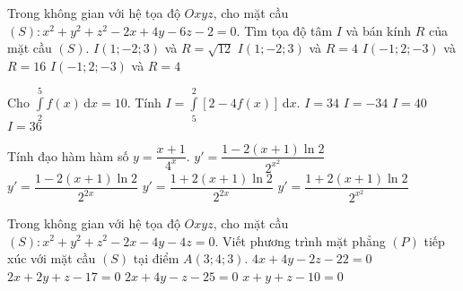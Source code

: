 \begin{ex}%
	Trong không gian với hệ tọa độ $Oxyz$, cho mặt cầu $(S)\colon x^2+y^2+z^2-2x+4y-6 z-2=0$. Tìm tọa độ tâm $I$ và bán kính $R$ của mặt cầu $(S)$.
	\choice
	{$I(1;-2;3)$ và $R=\sqrt{12}$}
	{\True $I(1;-2;3)$ và $R=4$}
	{$I(-1;2;-3)$ và $R=16$}
	{$I(-1;2;-3)$ và $R=4$}
\end{ex}
\begin{ex}%
	Cho $\displaystyle\int\limits_2^5 f(x) \mathrm{\,d}x=10$. Tính $I=\displaystyle\int\limits_5^2 \left[2-4f(x)\right] \mathrm{\,d}x$.
	\choice
	{\True $I=34$}
	{$I=-34$}
	{$I=40$}
	{$I=36$}
\end{ex}
\begin{ex}%
	Tính đạo hàm hàm số $y=\dfrac{x+1}{4^x}$.
	\choice
	{$y'=\dfrac{1-2(x+1)\ln 2}{2^{x^2}}$}
	{\True $y'=\dfrac{1-2(x+1)\ln 2}{2^{2x}}$}
	{$y'=\dfrac{1+2(x+1)\ln 2}{2^{2x}}$}
	{$y'=\dfrac{1+2(x+1)\ln 2}{2^{x^2}}$}
\end{ex}
\begin{ex}%
	Trong không gian với hệ tọa độ $Oxyz$, cho mặt cầu $(S)\colon x^2+y^2+z^2-2x-4y-4z=0$. Viết phương trình mặt phẳng $(P)$ tiếp xúc với mặt cầu $(S)$ tại điểm $A(3;4;3)$.
	\choice
	{$4x+4y-2z-22=0$}
	{\True $2x+2y+z-17=0$}
	{$2x+4y-z-25=0$}
	{$x+y+z-10=0$}
\end{ex}
